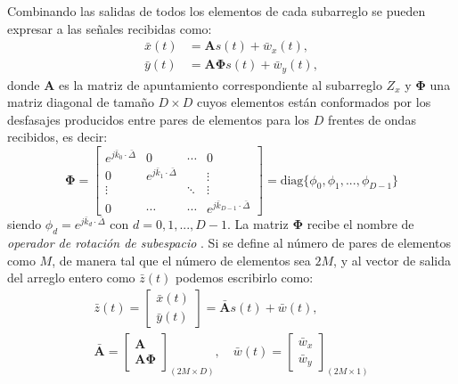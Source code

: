 Combinando las salidas de todos los elementos de cada subarreglo se pueden expresar a las señales recibidas como:
\begin{equation}
    \begin{split}
        \bar{x}(t)&=\mathbf{A}s(t)+\bar{w}_x(t),\\
        \bar{y}(t)&=\mathbf{A \Phi} s(t)+ \bar{w}_y(t),
    \end{split}
\end{equation}
donde $\mathbf{A}$ es la matriz de apuntamiento correspondiente al subarreglo $Z_x$ y $\mathbf{\Phi}$ una matriz diagonal de tamaño $D \times D$ cuyos elementos están conformados por los desfasajes producidos entre pares de elementos para los $D$ frentes de ondas recibidos, es decir:
\begin{equation}
    \mathbf{\Phi}= \begin{bmatrix}
        e^{j\bar{k}_0\cdot \bar{\Delta}} & 0                                & \cdots & 0                                    \\
        0                                & e^{j\bar{k}_1\cdot \bar{\Delta}} &        & \vdots                               \\
        \vdots                           &                                  & \ddots & \vdots                               \\
        0                                & \cdots                           & \cdots & e^{j\bar{k}_{D-1}\cdot \bar{\Delta}}
    \end{bmatrix}=\textrm{diag}\{\phi_0,\phi_1,...,\phi_{D-1}\}
\end{equation}
siendo $\phi_d=e^{j\bar{k}_d\cdot \bar{\Delta}}$ con $d=0,1,...,D-1$. La matriz $\mathbf{\Phi}$ recibe el nombre de \emph{operador de rotación de subespacio} \cite{bib:esprit_roy}.
Si se define al número de pares de elementos como $M$, de manera tal que el número de elementos sea $2M$, y al vector de salida del arreglo entero como $\bar{z}(t)$ podemos escribirlo como:
\begin{gather}
    \bar{z}(t)=\begin{bmatrix}
        \bar{x}(t) \\
        \bar{y}(t)
    \end{bmatrix}
    = \bar{\mathbf{A}} s(t) + \bar{w}(t),\\
    \bar{\mathbf{A}}=\begin{bmatrix}
        \mathbf{A} \\
        \mathbf{A\Phi}
    \end{bmatrix}_{(2M \times D)},
    \quad
    \bar{w}(t)=\begin{bmatrix}
        \bar{w}_x \\
        \bar{w}_y
    \end{bmatrix}_{(2M \times 1)}\nonumber
\end{gather}

